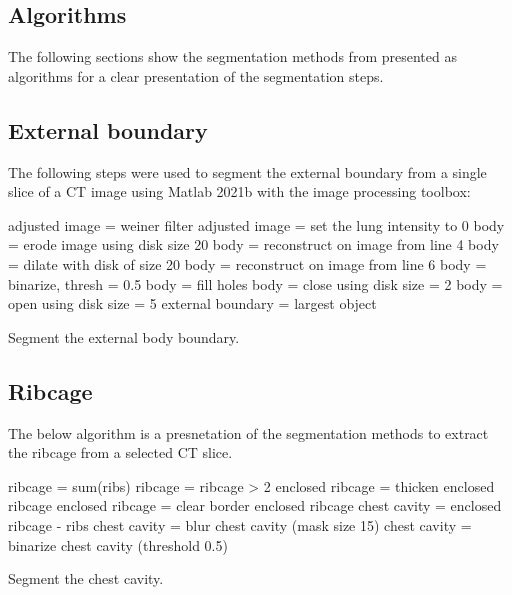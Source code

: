 \begin{appendices}
\chapter{Algorithms} \label{app:appendix-algos}
The following sections show the segmentation methods from 
presented as algorithms for a clear presentation of the segmentation steps. 

\section{External boundary}
The following steps were used to segment the external boundary 
from a single slice 
of a CT image using Matlab 2021b  
with the image processing toolbox: \\
\begin{algorithm}[H]
	\SetAlgoLined
		adjusted image = weiner filter\;
		adjusted image = set the lung intensity to 0\;
		body = erode image using disk size 20\;
		body = reconstruct on image from line 4\;
		body = dilate with disk of size 20\;
		body = reconstruct on image from line 6\;
		body = binarize, thresh = 0.5\;
		body = fill holes\;
		body = close using disk size = 2\;
		body = open using disk size = 5\;
		external boundary = largest object\;
	\caption{Segment the external body boundary.}
\end{algorithm}

\section{Ribcage}

The below algorithm is a presnetation of the segmentation methods to extract the 
ribcage from a selected CT slice. \\

\begin{algorithm}[H]
	\SetAlgoLined
		ribcage = sum(ribs)\;
		ribcage = ribcage > 2 \;
		enclosed ribcage = thicken enclosed ribcage \;
		enclosed ribcage = clear border enclosed ribcage \;
		chest cavity = enclosed ribcage - ribs \;
		chest cavity = blur chest cavity (mask size 15) \;
		chest cavity = binarize chest cavity (threshold 0.5) \;
	\caption{Segment the chest cavity.}
\end{algorithm}


\end{appendices}

